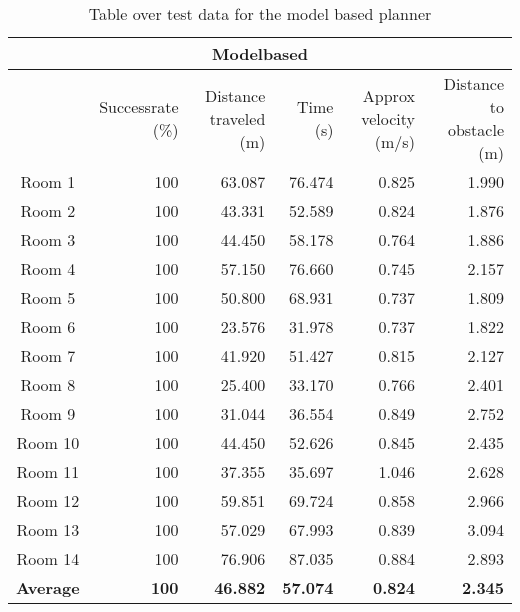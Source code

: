 \documentclass[../Head/Main.tex]{subfiles}
\begin{document}
\begin{table}[H]
	\begin{tabular}{|c|r|r|r|r|r|}
		\hline
		\multicolumn{6}{|c|}{\textbf{Modelbased}} \\ \hline
		 & Successrate (\%) & Distance traveled (m) & Time (s) & 				Approx velocity (m/s) & Distance to obstacle (m) \\ \hline
		Room 1 & 100 & 63.087 & 76.474 & 0.825 & 1.990 \\ \hline
		Room 2 & 100 & 43.331 & 52.589 & 0.824 & 1.876 \\ \hline
		Room 3 & 100 & 44.450 & 58.178 & 0.764 & 1.886 \\ \hline
		Room 4 & 100 & 57.150 & 76.660 & 0.745 & 2.157 \\ \hline
		Room 5 & 100 & 50.800 & 68.931 & 0.737 & 1.809 \\ \hline
		Room 6 & 100 & 23.576 & 31.978 & 0.737 & 1.822 \\ \hline
		Room 7 & 100 & 41.920 & 51.427 & 0.815 & 2.127 \\ \hline
		Room 8 & 100 & 25.400 & 33.170 & 0.766 & 2.401 \\ \hline
		Room 9 & 100 & 31.044 & 36.554 & 0.849 & 2.752 \\ \hline
		Room 10 & 100 & 44.450 & 52.626 & 0.845 & 2.435 \\ \hline
		Room 11 & 100 & 37.355 & 35.697 & 1.046 & 2.628 \\ \hline
		Room 12 & 100 & 59.851 & 69.724 & 0.858 & 2.966 \\ \hline
		Room 13 & 100 & 57.029 & 67.993 & 0.839 & 3.094 \\ \hline
		Room 14 & 100 & 76.906 & 87.035 & 0.884 & 2.893 \\ \hline
		\textbf{Average} & \textbf{100} & \textbf{46.882} & \textbf{57.074} & \textbf{0.824} & \textbf{2.345} \\ \hline
	\end{tabular}
	\caption{Table over test data for the model based planner}
	\label{tab:modelbased}
\end{table}
\end{document}
